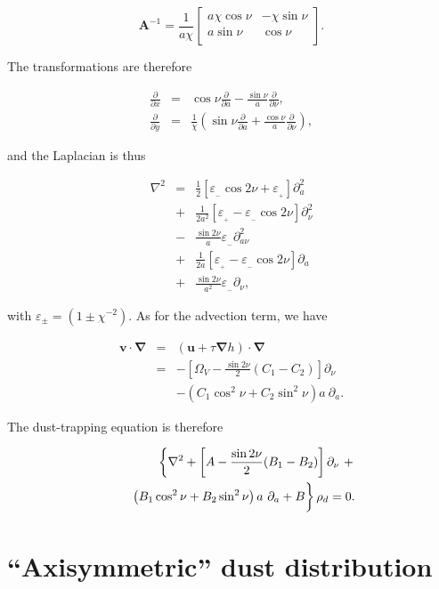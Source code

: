 \documentclass[apj]{emulateapj}
\newcommand{\pderiv}[2]{\frac{\partial #1}{\partial #2}}
\newcommand{\vt}[1]{\mathbf{#1}}       %
\renewcommand{\v}[1]{{\boldsymbol{#1}}} %
\def\white#1{\textcolor{white}{#1}}
\newcommand{\del}{\v{\nabla}}
\newcommand{\grad}{\del}
\newcommand{\Laplace}{\nabla^2}
\newcommand{\beq}{\begin{equation}}
\newcommand{\eeq}{\end{equation}}
\newcommand{\beqn}{\begin{eqnarray}}
\newcommand{\eeqn}{\end{eqnarray}}
\newcommand{\epsp}{\varepsilon_{_{+}}}
\newcommand{\epsm}{\varepsilon_{_{-}}}
\begin{document}
\beq
\vt{A}^{-1} = \frac{1}{a\chi} \left[\begin{array}{cc}
a\chi\cos\nu  & -\chi\sin\nu  \\
a\sin\nu  & \cos\nu \\
\end{array}\right].  
\eeq

The transformations are therefore

\beqn
\pderiv{}{x} &=& \cos\nu \pderiv{}{a} - \frac{\sin\nu}{a} \pderiv{}{\nu}, \\
\pderiv{}{y} &=& \frac{1}{\chi}\left(\sin\nu \pderiv{}{a} + \frac{\cos\nu}{a} \pderiv{}{\nu} \right),
\eeqn

\noindent and the Laplacian is thus 

\beqn
\Laplace{} &= &\frac{1}{2}\left[ \epsm \cos 2\nu +  \epsp\right] \partial^2_a  \nonumber \\
                &+& \frac{1}{2a^2}\left[ \epsp - \epsm \cos 2\nu\right] \partial^2_\nu \nonumber \\
                &-& \frac{\sin 2\nu}{a}\epsm \partial^2_{a\nu}   \nonumber \\
                &+& \frac{1}{2a}\left[ \epsp - \epsm \cos 2\nu\right] \partial_a \nonumber \\
                &+& \frac{\sin 2\nu}{a^2} \epsm\partial_\nu, \label{eq:laplace}
\eeqn

\noindent with $\varepsilon_{\pm} = (1 \pm \chi^{-2})$.  As for the advection term, we have 

\beqn
\v{v}\cdot\del &=& (\v{u} + \tau \grad h) \cdot \del \nonumber \\
&=& - \left[\varOmega_V - \frac{\sin2\nu}{2}  (C_1 -  C_2)\right]\partial_\nu \nonumber \\
&&- \left( C_1 \cos^2\nu   + C_2\sin^2\nu \right) a \ \partial_a. \label{eq:advection-term}
\eeqn

The dust-trapping equation is therefore 

\beqn 
&& \left\{ \Laplace{} + \left[A - \frac{\sin2\nu}{2}  (B_1 - B_2)\right]\partial_\nu \ +  \right.  \nonumber\\
&& \left. \white{\frac{1}{1}}\left( B_1 \cos^2\nu   + B_2\sin^2\nu
  \right) a \ \partial_a  + B \right\} \rho_d = 0. \label{eq:dust-trapping-uvzero}
\eeqn

\section{``Axisymmetric'' dust distribution}
\label{sect:axisymmetric}
\end{document}
